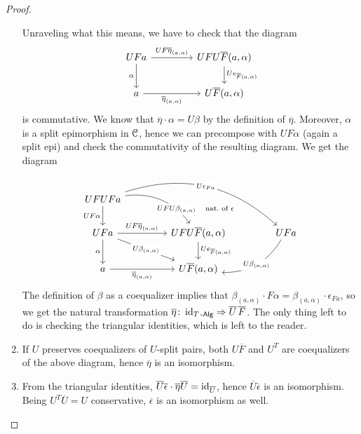 \documentclass[a4paper,11pt,oneside,openany]{scrbook}
\begin{document}
\begin{proof}
\begin{enumerate}
		      Unraveling what this means, we have to check that the diagram
		      \[
			      \begin{tikzcd}[column sep=1.5cm]
				      UFa\ar[r, "UF\overline{\eta}_{(a,\alpha)}"]\ar[d,"\alpha"']
				      & UFU\overline{F}(a,\alpha)\ar[d, "U\epsilon_{\overline{F}(a,\alpha)}"] \\
				      a\ar[r, "\overline{\eta}_{(a,\alpha)}"']
				      & U\overline{F}(a,\alpha)
			      \end{tikzcd}
		      \]
		      is commutative. We know that $\overline{\eta}\cdot\alpha=U\beta$
              by the definition of $\overline{\eta}$. Moreover, $\alpha$ is a
              split epimorphism in $\operatorname{\mathcal{C}}$, hence we can precompose with $UF\alpha$
              (again a split epi) and check the commutativity of the resulting
              diagram. We get the diagram
		      \[
			      \begin{tikzcd}[column sep=1.5cm]
				      UFUFa\arrow[d, "UF\alpha"'] \arrow[rd, bend left, near end, "UFU\beta_{(a,\alpha)}"description] \arrow[rrd, bend left, "U\epsilon_{Fa}"description] &            & \ar[lld,draw=none, near start,"\hspace{-1.5cm}\text{nat.\ of\ } \epsilon" description]  \\
				      UFa\arrow[d, "\alpha"'] \arrow[r, "UF\overline{\eta}_{(a,\alpha)}"] \arrow[rd, "U\beta_{(a,\alpha)}"description]                        & UFU\overline{F}(a,\alpha)  \arrow[d, "U\epsilon_{\overline{F}(a,\alpha)}"] &        UFa           \arrow[ld, bend left, "U\beta_{(a,\alpha)}"description]      \\
				      a\arrow[r, "\overline{\eta}_{(a,\alpha)}"']                                             &     U\overline{F}(a,\alpha)       &
			      \end{tikzcd}
		      \]
		      The definition of $\beta$ as a coequalizer implies that
              $\beta_{(a,\alpha)}\cdot
              F\alpha=\beta_{(a,\alpha)}\cdot\epsilon_{Fa}$, so we get the
              natural transformation
              $\overline{\eta}\colon\operatorname{id}_{T\operatorname{-\mathsf{Alg}}}\Rightarrow\overline{U}\hspace{.5mm}\overline{F}$.
              The only thing left to do is checking the triangular identities,
              which is left to the reader.

		\item If $U$ preserves coequalizers of $U$-split pairs, both
            $U\overline{F}$ and $U^T$ are coequalizers of the above diagram,
            hence $\overline{\eta}$ is an isomorphism.

		\item From the triangular identities,
            $\overline{U}\overline{\epsilon}\cdot\overline{\eta}\overline{U}=\operatorname{id}_{\overline{U}}$,
            hence $\overline{U}\overline{\epsilon}$ is an isomorphism. Being
            $U^T\overline{U}=U$ conservative, $\overline{\epsilon}$ is an
            isomorphism as well. \qedhere
	\end{enumerate}
\end{proof}
\end{document}
